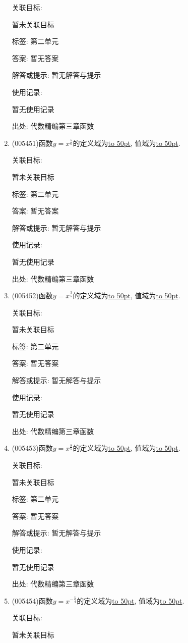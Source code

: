 \documentclass[10pt,a4paper]{article}
\newcommand{\blank}[1]{\underline{\hbox to #1pt{}}}
\begin{document}
\begin{enumerate}[1.]
关联目标:

暂未关联目标



标签: 第二单元

答案: 暂无答案

解答或提示: 暂无解答与提示

使用记录:

暂无使用记录


出处: 代数精编第三章函数
\item { (005451)}函数$y=x^{\frac 56}$的定义域为\blank{50}, 值域为\blank{50}.


关联目标:

暂未关联目标



标签: 第二单元

答案: 暂无答案

解答或提示: 暂无解答与提示

使用记录:

暂无使用记录


出处: 代数精编第三章函数
\item { (005452)}函数$y=x^{\frac 35}$的定义域为\blank{50}, 值域为\blank{50}.


关联目标:

暂未关联目标



标签: 第二单元

答案: 暂无答案

解答或提示: 暂无解答与提示

使用记录:

暂无使用记录


出处: 代数精编第三章函数
\item { (005453)}函数$y=x^{\frac 85}$的定义域为\blank{50}, 值域为\blank{50}.


关联目标:

暂未关联目标



标签: 第二单元

答案: 暂无答案

解答或提示: 暂无解答与提示

使用记录:

暂无使用记录


出处: 代数精编第三章函数
\item { (005454)}函数$y=x^{-\frac 54}$的定义域为\blank{50}, 值域为\blank{50}.


关联目标:

暂未关联目标




\end{enumerate}
\end{document}
